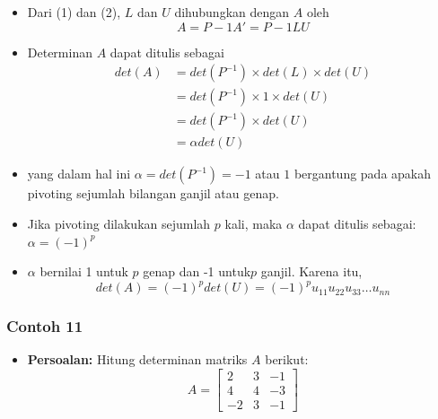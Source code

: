 \documentclass[pdflatex,compress,mathserif]{beamer}
\begin{document}
\begin{frame}
	\begin{itemize}
		\item Dari (1) dan (2), $ L $ dan $ U $ dihubungkan dengan $ A $ oleh
		\[ A = P -1 A' = P -1 LU \]
		\item Determinan $ A $ dapat ditulis sebagai
		\begin{align*}
			det(A) &= det(P^{-1}) \times det(L) \times det(U) \\
			&= det(P^{-1}) \times 1 \times det(U) \\
			&= det(P^{-1}) \times det(U) \\
			&= \alpha det(U)
		\end{align*}
		\item yang dalam hal ini $ \alpha = det(P^{-1}) = -1 $ atau $ 1 $ bergantung pada apakah pivoting sejumlah bilangan ganjil atau genap.
	\end{itemize}
\end{frame}

\begin{frame}
	\begin{itemize}
		\item Jika pivoting dilakukan sejumlah $ p $ kali, maka $\alpha$ dapat ditulis sebagai:
		$ \alpha = (-1)^p $
		\item $\alpha$ bernilai 1 untuk $ p $ genap dan -1 untuk$  p $ ganjil. Karena itu,
		\[ det(A) = (-1)^pdet(U) = (-1)^p u_{11} u_{22} u_{33} \dots u_{nn} \]
	\end{itemize}
\end{frame}

\begin{frame}
	\frametitle{Contoh 11}
	\begin{itemize}
		\item \textbf{Persoalan:} Hitung determinan matriks $ A $ berikut:
		\[ A = \begin{bmatrix}
		2 & 3 & -1 \\ 4 & 4 & -3 \\ -2 & 3 & -1
		\end{bmatrix} \]
	\end{itemize}
\end{frame}
\end{document}
